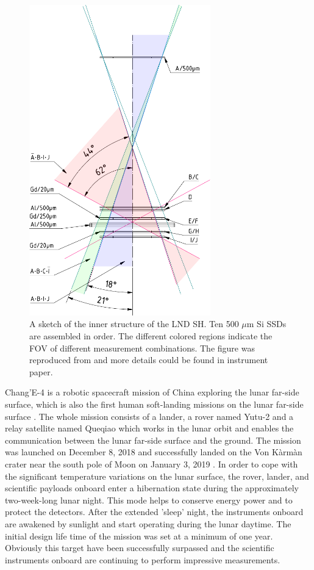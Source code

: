 \begin{figure}[!htbp]
    \centering
    \includegraphics[width = 0.7\textwidth, height = 0.5 \textheight]{images/change4_lnd-c9_trigger-cones-colored.pdf}
    \caption[The inner structure of LND \ac{SH}]{A sketch of the inner structure of the \ac{LND} \ac{SH}. Ten 500 $\mu$m Si \acp{SSD} are assembled in order. The different colored regions indicate the \ac{FOV} of different measurement combinations. The figure was reproduced from \citet{Wimmer-2020-LND} and more details could be found in instrument paper.}
    \label{Fig:LND_sensor_head}
\end{figure}
Chang'E-4 is a robotic spacecraft mission of China exploring the lunar far-side surface, which is also the first human soft-landing missions on the lunar far-side surface \citep{Li2021SSRv}. The whole mission consists of a lander, a rover named Yutu-2 and a relay satellite named Queqiao which works in the lunar orbit and enables the communication between the lunar far-side surface and the ground. The mission was launched on December 8, 2018 and successfully landed on the Von K\`arm\`an crater near the south pole of Moon on January 3, 2019 \citep{Wu2019NatGe}. In order to cope with the significant temperature variations on the lunar surface, the rover, lander, and scientific payloads onboard enter a hibernation state during the approximately two-week-long lunar night. This mode helps to conserve energy power and to protect the detectors.  After the extended 'sleep' night, the instruments onboard are awakened by sunlight and start operating during the lunar daytime. The initial design life time of the mission was set at a minimum of one year. Obviously this target have been successfully surpassed and the scientific instruments onboard are continuing to perform impressive measurements.

